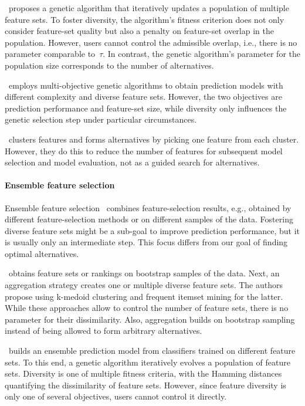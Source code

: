 \documentclass{article}
\theoremstyle{definition}
\begin{document}
\cite{siddiqi2020genetic}~proposes a genetic algorithm that iteratively updates a population of multiple feature sets.
To foster diversity, the algorithm's fitness criterion does not only consider feature-set quality but also a penalty on feature-set overlap in the population.
However, users cannot control the admissible overlap, i.e., there is no parameter comparable to~$\tau$.
In contrast, the genetic algorithm's parameter for the population size corresponds to the number of alternatives.

\cite{emmanouilidis1999selecting}~employs multi-objective genetic algorithms to obtain prediction models with different complexity and diverse feature sets.
However, the two objectives are prediction performance and feature-set size, while diversity only influences the genetic selection step under particular circumstances.

\cite{mueller2021feature}~clusters features and forms alternatives by picking one feature from each cluster.
However, they do this to reduce the number of features for subsequent model selection and model evaluation, not as a guided search for alternatives.

\paragraph{Ensemble feature selection}

Ensemble feature selection~\cite{saeys2008robust, seijo2017ensemble} combines feature-selection results, e.g., obtained by different feature-selection methods or on different samples of the data.
Fostering diverse feature sets might be a sub-goal to improve prediction performance, but it is usually only an intermediate step.
This focus differs from our goal of finding optimal alternatives.

\cite{woznica2012model}~obtains feature sets or rankings on bootstrap samples of the data.
Next, an aggregation strategy creates one or multiple diverse feature sets.
The authors propose using k-medoid clustering and frequent itemset mining for the latter.
While these approaches allow to control the number of feature sets, there is no parameter for their dissimilarity.
Also, aggregation builds on bootstrap sampling instead of being allowed to form arbitrary alternatives.

\cite{liu2019subspace}~builds an ensemble prediction model from classifiers trained on different feature sets.
To this end, a genetic algorithm iteratively evolves a population of feature sets.
Diversity is one of multiple fitness criteria, with the Hamming distances quantifying the dissimilarity of feature sets.
However, since feature diversity is only one of several objectives, users cannot control it directly.
\end{document}
